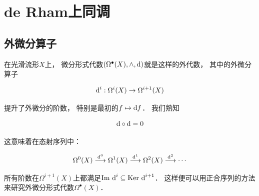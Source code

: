 \chapter{de Rham上同调}

\section{外微分算子}

在光滑流形$X$上，
微分形式代数$(\Omega^\bullet(X),\wedge,\text d)$就是这样的外代数，
其中的外微分算子

$$
\text d^i: \Omega^i(X) \to \Omega^{i+1}(X)
$$

提升了外微分的阶数，
特别是最初的$f \mapsto \text d f$．
我们熟知

$$
\text d \circ \text d = 0
$$

这意味着在态射序列中：

$$
\Omega^0(X) \stackrel{\text d^0}{\longrightarrow} 
\Omega^1(X) \stackrel{\text d^1}{\longrightarrow} 
\Omega^2(X) \stackrel{\text d^2}{\longrightarrow} \cdots
$$

所有阶数在$\Omega^{i+1}(X)$上都满足$\text{Im} \ \text d^i \subseteq \text{Ker} \ \text d^{i+1}$．
这样便可以用正合序列的方法来研究外微分形式代数$\Omega^\bullet(X)$．

